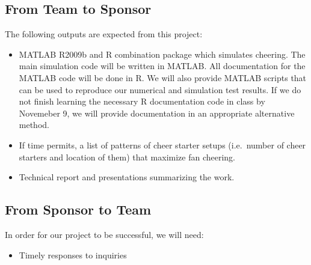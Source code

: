 \documentclass[12pt,letterpaper]{article}
\theoremstyle{definition}
\begin{document}
\subsection{From Team to Sponsor} %
The following outputs are expected from this project:
\begin{itemize}
    \item MATLAB R2009b and R combination package which simulates cheering. The main simulation code will be written in MATLAB. All documentation for the MATLAB code will be done in R. We will also provide MATLAB scripts that can be used to reproduce our numerical and simulation test results. If we do not finish learning the necessary R documentation code in class by Novemeber 9, we will provide documentation in an appropriate alternative method.
    \item If time permits, a list of patterns of cheer starter setups (i.e.~number of cheer starters and location of them) that maximize fan cheering.
    \item Technical report and presentations summarizing the work. 
\end{itemize}

\subsection{From Sponsor to Team} %

In order for our project to be successful, we will need:
\begin{itemize}
    \item Timely responses to inquiries 
\end{itemize}


\newpage



%
\end{document}
